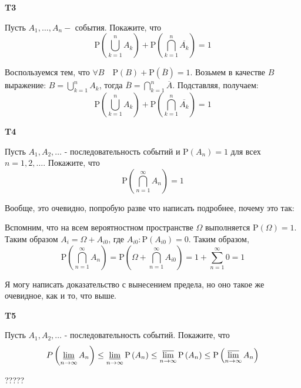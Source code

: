\documentclass[a4paper,12pt]{article} %
\begin{document}
\begin{example}\textbf{T3}

Пусть $A_{1}, \ldots, A_{n}-$ события. Покажите, что
$$
\mathrm{P}\left(\bigcup_{k=1}^{n} A_{k}\right)+\mathrm{P}\left(\bigcap_{k=1}^{n} \overline{A_{k}}\right)=1
$$

Воспользуемся тем, что $\forall B \quad \mathrm{P}(B)+\mathrm{P}(\overline{B})=1$. 
Возьмем в качестве $B$ выражение: $B=\bigcup_{k=1}^n A_k$, тогда 
$\overline{B}=\bigcap_{k=1}^n\overline{A}$.
Подставляя, получаем:
$$
\mathrm{P}\left(\bigcup_{k=1}^{n} A_{k}\right)+\mathrm{P}\left(\bigcap_{k=1}^{n} \overline{A_{k}}\right)=1
$$


\end{example}




\begin{example}\textbf{T4}

Пусть $A_{1}, A_{2}, \ldots$ - последовательность событий и $\mathrm{P}\left(A_{n}\right)=1$ для всех $n=1,2, \ldots .$ Покажите, что
$$
\mathrm{P}\left(\bigcap_{n=1}^{\infty} A_{n}\right)=1
$$

Вообще, это очевидно, попробую разве что написать подробнее, почему это так:

Вспомним, что на всем вероятностном пространстве $\Omega$ выполняется $ \mathrm{P}(\Omega)=1.$ 
Таким образом $A_i=\Omega+A_{i0}$, где $ A_{i0}: \mathrm{P}(A_{i0})=0$.
Таким образом, 
$$
\mathrm{P}\left(\bigcap_{n=1}^{\infty} A_{n}\right)=
\mathrm{P}\left(\Omega+\bigcap_{n=1}^{\infty} A_{i0}\right)=
1+\sum_{n=1}^{\infty} 0=1
$$

Я могу написать доказательство с вынесением предела, но оно такое же очевидное, как и то, что выше.


\end{example}


\begin{example}\textbf{T5}

Пусть $A_{1}, A_{2}, \ldots$ - последовательность событий. Покажите, что
$$
P\left(\varliminf_{n \rightarrow \infty} A_{n}\right) \leq 
\varliminf_{n \rightarrow \infty} \mathrm{P}\left(A_{n}\right) \leq 
\varlimsup_{n \rightarrow \infty} \mathrm{P}\left(A_{n}\right) \leq 
\mathrm{P}\left(\varlimsup_{n \rightarrow \infty} A_{n}\right)
$$

?????

\end{example}
\end{document}
